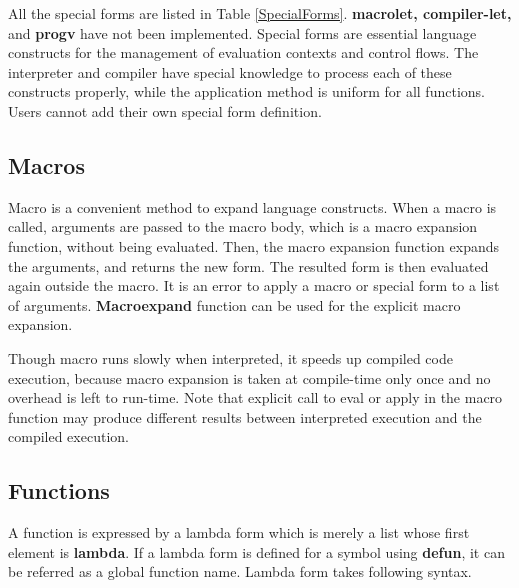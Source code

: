 All the special forms are listed in Table \ref{SpecialForms}.
{\bf macrolet, compiler-let,} and {\bf progv} have not been implemented.
Special forms are essential language constructs for the management of
evaluation contexts and control flows.
The interpreter and compiler have special knowledge to
process each of these constructs properly, while the application
method is uniform for all functions.
Users cannot add their own special form definition.

\subsection{Macros}

Macro is a convenient method to expand language constructs.
When a macro is called, arguments are passed to the macro body,
which is a macro expansion function, without being evaluated.
Then, the macro expansion function expands the arguments,
and returns the new form.
The resulted form is then evaluated again outside the macro.
It is an error to apply a macro or special form to a list of arguments.
{\bf Macroexpand} function can be used for the explicit macro expansion.

Though macro runs slowly when interpreted,
it speeds up compiled code execution,
because macro expansion is taken at compile-time only once
and no overhead is left to run-time.
Note that explicit call to eval or apply in the macro function may
produce different results between interpreted execution
and the compiled execution.

\subsection{Functions}

A function is expressed by a lambda form which is merely a list
whose first element is {\bf lambda}.
If a lambda form is defined for a symbol using {\bf defun}, it can be referred
as a global function name.
Lambda form takes following syntax.


